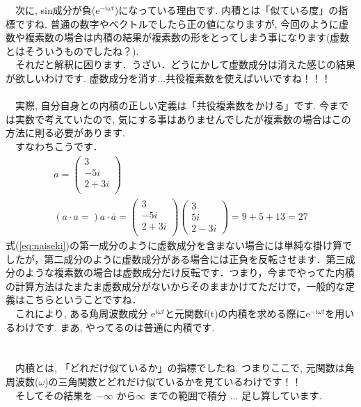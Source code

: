 \documentclass[11pt,a4paper,uplatex]{ujreport} 	%
\begin{document}
　次に, sin成分が負($\mathrm{e}^{-i\omega t}$)になっている理由です. 内積とは「似ている度」の指標ですね. 普通の数字やベクトルでしたら正の値になりますが, 今回のように虚数や複素数の場合は内積の結果が複素数の形をとってしまう事になります(虚数とはそういうものでしたね？).\\
　それだと解釈に困ります．うざい．どうにかして虚数成分は消えた感じの結果が欲しいわけです. 虚数成分を消す...共役複素数を使えばいいですね！！！\\
\\
　実際, 自分自身との内積の正しい定義は「共役複素数をかける」です. 今までは実数で考えていたので, 気にする事はありませんでしたが複素数の場合はこの方法に則る必要があります.\\
　すなわちこうです．
\begin{eqnarray}
a = \left(\begin{array}{cc}3\\ -5i\\ 2+3i\\ \end{array} \right) \nonumber \\
(a \cdot a = )a \cdot \overline{a} = \left(\begin{array}{cc}3\\ -5i\\ 2+3i\\ \end{array} \right)\left(\begin{array}{cc}3\\ 5i\\ 2-3i \end{array} \right) = 9 + 5 + 13= 27
\label{eq:naiseki}
\end{eqnarray}
式(\ref{eq:naiseki})の第一成分のように虚数成分を含まない場合には単純な掛け算でしたが，第二成分のように虚数成分がある場合には正負を反転させます．第三成分のような複素数の場合は虚数成分だけ反転です．つまり，今までやってた内積の計算方法はたまたま虚数成分がないからそのままかけてただけで，一般的な定義はこちらということですね．
\\
　これにより, ある角周波数成分 $\mathrm{e}^{i\omega t}$と元関数f(t)の内積を求める際に$\mathrm{e}^{-i\omega t}$を用いるわけです. まあ, やってるのは普通に内積です.\\
\\
\\
　内積とは, 「どれだけ似ているか」の指標でしたね. つまりここで, 元関数は角周波数($\omega$)の三角関数とどれだけ似ているかを見ているわけです！！\\
　そしてその結果を $-\infty$ から$\infty$ までの範囲で積分 ... 足し算しています.\\
\end{document}
